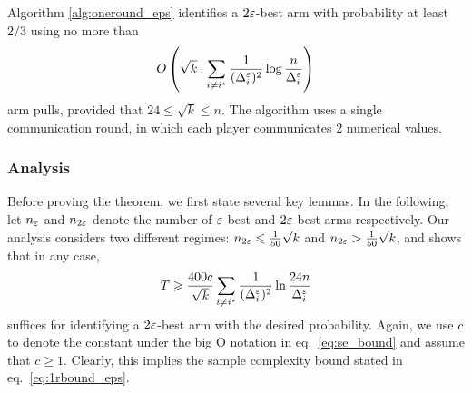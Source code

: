 


\begin{theorem} \label{thm:oneround_eps}
Algorithm \ref{alg:oneround_eps} identifies a $2\varepsilon$-best arm with probability at least $2/3$ using no more than
\begin{align} \label{eq:1rbound_eps}
	O\left(
		\sqrt{k} \cdot
		\sum_{i \ne i^\star} \frac{1}{(\Delta_i^\varepsilon)^2} \log \frac{n}{\Delta_i^\varepsilon}
	\right)
\end{align}
arm pulls, provided that $24 \le \sqrt{k} \le n$.
The algorithm uses a single communication round, in which each player communicates 2 numerical values.
\end{theorem}


\subsubsection{Analysis}


Before proving the theorem, we first state several key lemmas. In the following,
let $n_\varepsilon$ and $n_{2\varepsilon}$ denote the number of $\varepsilon$-best and $2\varepsilon$-best arms respectively.
Our analysis considers two different regimes: $n_{2\varepsilon} \leqslant \tfrac{1}{50}\sqrt{k}$ and $n_{2\varepsilon} > \tfrac{1}{50}\sqrt{k}$, and shows that in any case,
\begin{align} \label{eq:T_eps}
	T \geqslant
	\frac{400 c}{\sqrt{k}} 
		\sum_{i \ne i^\star} \frac{1}{(\Delta_i^{\varepsilon})^2}\ln \frac{24n}{\Delta_i^{\varepsilon}}
\end{align}
suffices for identifying a $2\varepsilon$-best arm with the desired probability.
Again, we use $c$ to denote the constant under the big O notation in eq.~\eqref{eq:se_bound} and assume that $c \ge 1$.
Clearly, this implies the sample complexity bound stated in eq.~\eqref{eq:1rbound_eps}.

